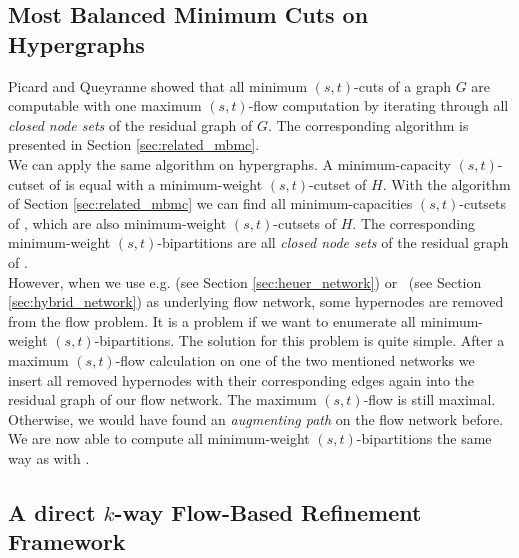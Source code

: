 \subsection{Most Balanced Minimum Cuts on Hypergraphs}
\label{sec:mbmc_hypergraphs}

Picard and Queyranne \cite{picard1980structure} showed that all minimum $(s,t)$-cuts 
of a graph $G$ are computable with one maximum $(s,t)$-flow computation by 
iterating through all \emph{closed node sets} of the residual graph of $G$. 
The corresponding algorithm is presented in Section \ref{sec:related_mbmc}. \\
We can apply the same algorithm on hypergraphs. A minimum-capacity $(s,t)$-cutset of 
is equal with a minimum-weight $(s,t)$-cutset of $H$. With the algorithm
of Section \ref{sec:related_mbmc} we can find all minimum-capacities
$(s,t)$-cutsets of , which are also minimum-weight $(s,t)$-cutsets
of $H$. The corresponding minimum-weight $(s,t)$-bipartitions are all
\emph{closed node sets} of the residual graph of . \\
However, when we use e.g.  (see Section \ref{sec:heuer_network})
or \ShortHybrid~(see Section \ref{sec:hybrid_network}) as underlying flow network,
some hypernodes are removed from the flow problem. It is a problem if we want to
enumerate all minimum-weight $(s,t)$-bipartitions. The solution for 
this problem is quite simple. After a maximum $(s,t)$-flow calculation
on one of the two mentioned networks we insert all removed hypernodes with
their corresponding edges again into the residual graph of our flow network.
The maximum $(s,t)$-flow is still maximal. Otherwise, we would have found an \emph{augmenting
path} on the flow network before. We are now able to compute all minimum-weight
$(s,t)$-bipartitions the same way as with .

\subsection{A direct $k$-way Flow-Based Refinement Framework}
\label{sec:flow_local_search_hypergraph}

